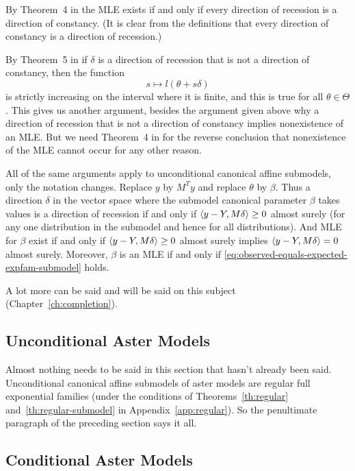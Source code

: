 By Theorem~{4} in \citet{geyer-gdor} the MLE exists if and only if
every direction of recession is a direction of constancy.
(It is clear from the definitions that every direction of constancy is
a direction of recession.)

By Theorem~{5} in \citet{geyer-gdor} if $\delta$ is a direction of recession
that is not a direction of constancy, then the function
$$
   s \mapsto l(\theta + s \delta)
$$
is strictly increasing on the interval where it is finite, and this is
true for all $\theta \in \Theta$.  This gives us another argument,
besides the argument given above why a direction of recession that is
not a direction of constancy implies nonexistence of an MLE.
But we need Theorem~{4} in \citet{geyer-gdor} for the reverse conclusion
that nonexistence of the MLE cannot occur for any other reason.

All of the same arguments apply to unconditional canonical affine submodels,
only the notation changes.  Replace $y$ by $M^T y$ and replace $\theta$ by
$\beta$.  Thus a direction $\delta$ in the vector space where the submodel
canonical parameter $\beta$ takes values is a direction of recession if and
only if $\langle y - Y, M \delta \rangle \ge 0$ almost surely (for any one distribution
in the submodel and hence for all distributions).  And MLE for $\beta$ exist
if and only if $\langle y - Y, M \delta \rangle \ge 0$ almost surely
implies $\langle y - Y, M \delta \rangle = 0$ almost surely.
Moreover, $\beta$ is an MLE if and only if
\eqref{eq:observed-equals-expected-expfam-submodel} holds.

A lot more can be said and will be said on this subject
(Chapter~\ref{ch:completion}).

\subsection{Unconditional Aster Models}

Almost nothing needs to be said in this section that hasn't already been said.
Unconditional canonical affine submodels of aster models are regular full
exponential families (under the conditions of Theorems~\ref{th:regular}
and~\ref{th:regular-submodel} in Appendix~\ref{app:regular}).  So the
penultimate paragraph of the preceding section says it all.

\subsection{Conditional Aster Models}
\label{sec:conditional-aster-model-mle}

